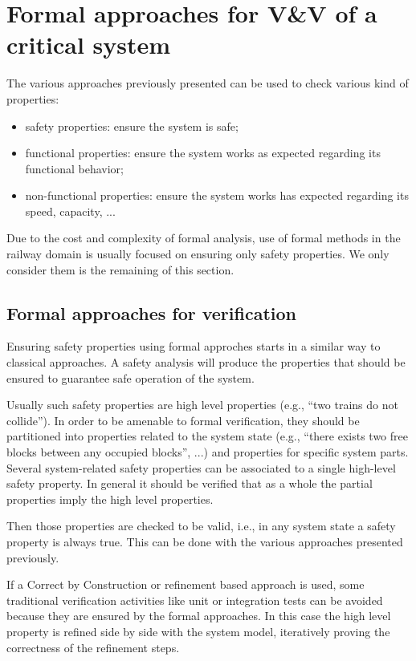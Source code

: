 
\section{Formal approaches for V\&V of a critical system}
\label{sec:formalVnV}

The various approaches previously presented can be used to check
various kind of properties:
\begin{itemize}
\item safety properties: ensure the system is safe;
\item functional properties: ensure the system works as expected
  regarding its functional behavior;
\item non-functional properties: ensure the system works has expected
  regarding its speed, capacity, ...
\end{itemize}

Due to the cost and complexity of formal analysis, use of formal
methods in the railway domain is usually focused on ensuring only
safety properties. We only consider them is the remaining of this
section.


\subsection{Formal approaches for verification}

Ensuring safety properties using formal approches starts in a similar
way to classical approaches. A safety analysis will produce the
properties that should be ensured to guarantee safe operation of the
system.

Usually such safety properties are high level properties (e.g., ``two
trains do not collide''). In order to be amenable to formal verification,
they should be partitioned into properties related to the system state
(e.g., ``there exists two free blocks between any occupied blocks'', ...)
and properties for specific system parts. Several system-related safety
properties can be associated to a single high-level safety property. In
general it should be verified that as a whole the partial properties
imply the high level properties.

Then those properties are checked to be valid, i.e., in any system
state a safety property is always true. This can be done with the
various approaches presented previously.

If a Correct by Construction or refinement based approach is used, some
traditional verification activities like unit or integration tests can be
avoided because they are ensured by the formal approaches. In this case
the high level property is refined side by side with the system model,
iteratively proving the correctness of the refinement steps.

